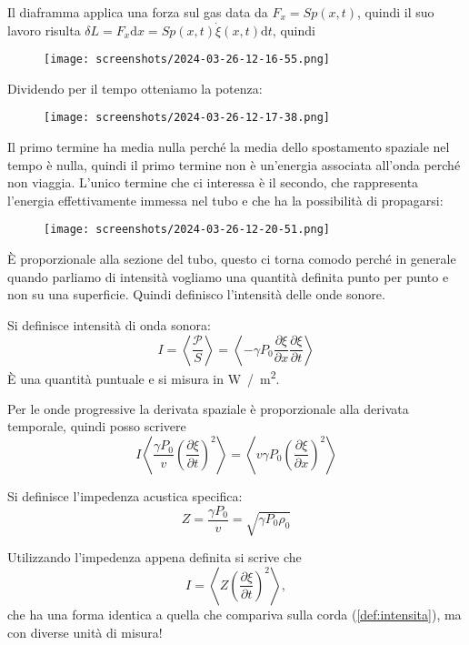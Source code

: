 Il diaframma applica una forza sul gas data da \(F_x = S p(x,t)\), quindi il suo lavoro risulta \(\delta L = F_x \mathrm{d} x = S p(x,t) \dot{\xi }(x,t) \mathrm{d} t\), quindi
\begin{figure}[H]
	\centering
	\texttt{[image: screenshots/2024-03-26-12-16-55.png]}
\end{figure}
Dividendo per il tempo otteniamo la potenza:
\begin{figure}[H]
	\centering
	\texttt{[image: screenshots/2024-03-26-12-17-38.png]}
\end{figure}
Il primo termine ha media nulla perché la media dello spostamento spaziale nel tempo è nulla, quindi il primo termine non è un'energia associata all'onda perché non viaggia. L'unico termine che ci interessa è il secondo, che rappresenta l'energia effettivamente immessa nel tubo e che ha la possibilità di propagarsi:
\begin{figure}[H]
	\centering
	\texttt{[image: screenshots/2024-03-26-12-20-51.png]}
\end{figure} 
È proporzionale alla sezione del tubo, questo ci torna comodo perché in generale quando parliamo di intensità vogliamo una quantità definita punto per punto e non su una superficie. Quindi definisco l'intensità delle onde sonore.
\begin{definition}
	Si definisce intensità di onda sonora:
	\begin{equation}
		I = \left\langle \frac{\mathcal{P} }{S} \right\rangle = \left\langle -\gamma P_0 \frac{\partial \xi }{\partial x} \frac{\partial \xi }{\partial t}  \right\rangle 
	\end{equation}
	È una quantità puntuale e si misura in \unit{W / m^2}.
\end{definition}
Per le onde progressive la derivata spaziale è proporzionale alla derivata temporale, quindi posso scrivere
\begin{equation}
	I \left\langle \frac{\gamma P_0}{v} \left( \frac{\partial \xi }{\partial t}  \right) ^{2}   \right\rangle = \left\langle v \gamma P_0 \left( \frac{\partial \xi }{\partial x}  \right)^{2}   \right\rangle 
\end{equation}
\begin{definition}
	Si definisce l'impedenza acustica specifica:
	\begin{equation}
		Z = \frac{\gamma P_0}{v} = \sqrt{\gamma P_0 \rho _0} 
	\end{equation}
\end{definition}
Utilizzando l'impedenza appena definita si scrive che
\begin{equation}
	I = \left\langle Z \left( \frac{\partial \xi }{\partial t}  \right) ^{2}  \right\rangle,
\end{equation}
che ha una forma identica a quella che compariva sulla corda (\autoref{def:intensita}), ma con diverse unità di misura!
